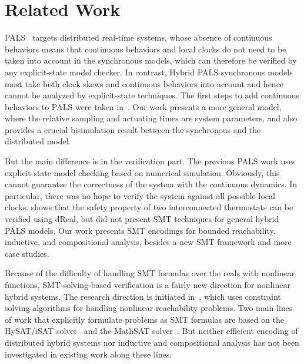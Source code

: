 

\section{Related Work}
\label{sec:related-work}

PALS~\cite{pals-rtss09,mr-pals-journal,pals-tcs,al2012pattern} targets
distributed real-time systems, whose absence of continuous behaviors
means that continuous behaviors and local clocks do not need to be
taken into account in the synchronous models, which can therefore be
verified by any explicit-state model checker. In contrast, Hybrid PALS
synchronous models must take both clock skews and continuous behaviors
into account and hence cannot be analyzed by explicit-state
techniques. The first steps to add continuous behaviors to PALS were
taken in~\cite{hybrid-pals}. Our work presents a more general
model, where the relative sampling and actuating times are system
parameters,  and also provides a crucial bisimulation result between
the 
synchronous and the distributed model. 

But the main difference is in the verification part. 
The previous PALS work uses explicit-state model checking based on numerical simulation.
Obviously, this cannot guarantee the correctness of the system with the continuous dynamics.
In particular,
there was no hope to verify the system against all possible local clocks.
\cite{hybrid-pals} shows that the safety property of two interconnected thermostats
can be verified using \textsf{dReal}, but did not present SMT techniques for 
general hybrid PALS models.
Our work presents SMT encodings for bounded reachability, inductive, and
compositional analysis, %
besides a new SMT framework and more case studies.

Because of the difficulty of handling SMT
formulas over the reals with nonlinear functions, 
SMT-solving-based verification is a fairly new direction for nonlinear hybrid
systems. The research
direction is initiated in~\cite{ratschan2007safety}, which uses constraint
solving algorithms for handling nonlinear reachability problems. Two
main lines of work that explicitly formulate problems as SMT formulas
are based on the HySAT/iSAT
solver~\cite{DBLP:journals/fmsd/FranzleH07,eggers2008sat}
and the MathSAT
solver~\cite{DBLP:conf/aaai/CimattiMT12,DBLP:conf/fmcad/CimattiMT12}.
But neither efficient encoding of distributed hybrid systems nor 
inductive and compositional analysis has not been
investigated in existing work along these lines. 

